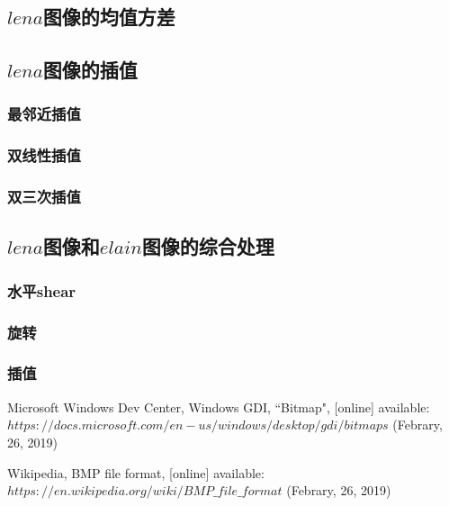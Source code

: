 \documentclass[UTF8]{ctexart}
\begin{document}
\subsection{$lena$图像的均值方差}

\subsection{$lena$图像的插值}

\subsubsection{最邻近插值}

\subsubsection{双线性插值}

\subsubsection{双三次插值}

\subsection{$lena$图像和$elain$图像的综合处理}

\subsubsection{水平shear}

\subsubsection{旋转}

\subsubsection{插值}

\newpage
\begin{thebibliography}{}
     Microsoft Windows Dev Center, 
    Windows GDI, ``Bitmap", [online] available: 
    \newline $https://docs.microsoft.com/en-us/windows/desktop/gdi/bitmaps$  
    (Febrary, 26, 2019)

	 Wikipedia, BMP file format, [online] available: \newline 
	$https://en.wikipedia.org/wiki/BMP\_file\_format$ (Febrary, 26, 2019)

\end{thebibliography}

\clearpage
\end{document}
